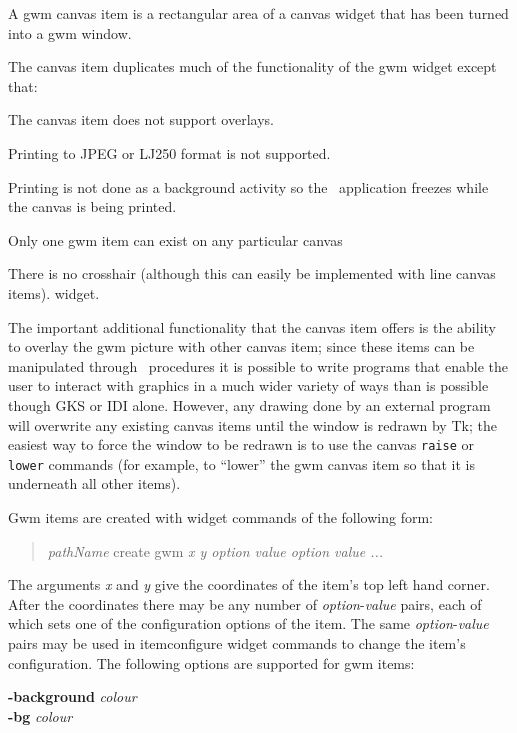 A gwm canvas item is a rectangular area of a canvas widget that has been
turned into a gwm window.

The canvas item duplicates much of the functionality of the gwm widget
except that:

\begin{description}
\item The canvas item does not support overlays.
\item Printing to JPEG or LJ250 format is not supported.
\item Printing is not done as a background activity so the \Tk\ application
freezes while the canvas is being printed.
\item Only one gwm item can exist on any particular canvas
\item There is no crosshair (although this can easily be implemented with
line canvas items).
widget.
\end{description}

The important additional functionality that the canvas item offers is the
ability to overlay the gwm picture with other canvas item; since these items
can be manipulated through \Tcl\ procedures it is possible to write programs
that enable the user to interact with graphics in a much wider variety of
ways than is possible though GKS or IDI alone. However, any drawing done
by an external program will overwrite any existing canvas items until the
window is redrawn by Tk; the easiest way to force the window to be redrawn
is to use the canvas {\tt raise} or {\tt lower} commands (for example, to
``lower'' the gwm canvas item so that it is underneath all  other items).

Gwm items are created with widget commands of the following form:

\begin{quote}
{\em pathName} create gwm {\em x y option value option value ...}
\end{quote}

The arguments {\em x} and {\em y} give the coordinates of the item's
top left hand corner. After the coordinates there may be any number of
{\em option}-{\em value} pairs, each of which sets one of the
configuration options of the item. The same {\em option}-{\em value}
pairs may be used in itemconfigure widget commands to change the item's
configuration. The following options are supported for gwm items:

{\bf -background} {\em colour}\\
{\bf -bg} {\em colour}

